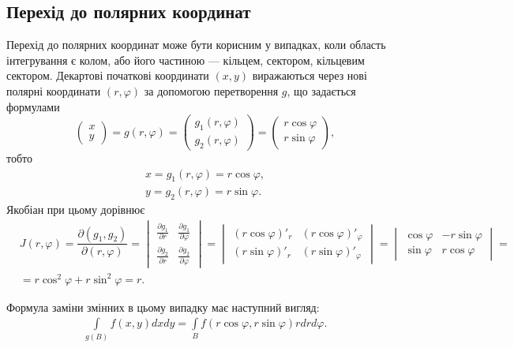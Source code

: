 \subsection{Перехід до полярних координат}
Перехід до полярних координат може бути корисним у випадках, коли область інтегрування є колом, або його частиною --- кільцем, сектором, кільцевим сектором. Декартові початкові координати ${\left(x, y\right)}$ виражаються через нові полярні координати ${\left(r, \varphi\right)}$ за допомогою перетворення $g$, що задається формулами
\[
\left(\begin{array}{c}x\\y\end{array}\right) = g\left(r,\varphi\right) =
\left(
\begin{array}{c}
g_1\left(r,\varphi\right)\\
g_2\left(r,\varphi\right)
\end{array}
\right)=
\left(
\begin{array}{c}
r\cos\varphi\\
r\sin\varphi
\end{array}
\right),
\]
тобто
\begin{align*}
x = g_1\left(r, \varphi\right)= r \cos\varphi,\\
y = g_2\left(r, \varphi\right)= r \sin\varphi.
\end{align*}
Якобіан при цьому дорівнює
\begin{align*}
&J(r, \varphi) = \dfrac{\partial\left(g_1,g_2\right)}{\partial\left(r,\varphi\right)} = \begin{vmatrix}\frac{\partial g_1}{\partial r} & \frac{\partial g_1}{\partial \varphi}\\[6pt]\frac{\partial g_2}{\partial r} & \frac{\partial g_2}{\partial \varphi}\end{vmatrix} = \begin{vmatrix}\left(r \cos \varphi\right)'_{r}& \left(r \cos \varphi\right)'_{\varphi}\\[6pt]\left(r \sin \varphi\right)'_{r} & \left(r \sin \varphi\right)'_{\varphi}\end{vmatrix} = \begin{vmatrix}\cos\varphi & -r\sin\varphi\\[6pt]\sin\varphi & r\cos\varphi\end{vmatrix} =&\\&= r \cos^2 \varphi + r \sin^2 \varphi = r.&
\end{align*}

Формула заміни змінних в цьому випадку має наступний вигляд:
\begin{align*}
\boxed{\int\limits_{g\left(B\right)} f(x, y) dx dy = \int\limits_{B} f\left(r \cos \varphi, r \sin \varphi\right) r dr d\varphi.}
\end{align*}

